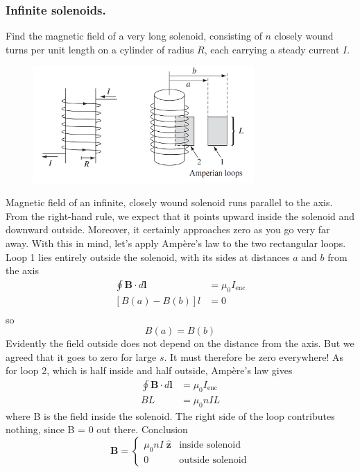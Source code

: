 \documentclass[../../../main.tex]{subfiles}
\begin{document}
\subsubsection*{Inﬁnite solenoids.} Find the magnetic ﬁeld of a very long solenoid, consisting of $n$ closely wound turns per unit length on a cylinder of radius $R$, each carrying a steady current $I$.

\begin{figure}[ht]
    \centering
    \includegraphics[width=0.75\textwidth]{./Rss/Electromagnetism/Magnetostatics/Solenoid.png}
\end{figure}

Magnetic ﬁeld of an inﬁnite, closely wound solenoid runs parallel to the axis. From the right-hand rule, we expect that it points upward inside the solenoid and downward outside. Moreover, it certainly approaches zero as you go very far away. With this in mind, let’s apply Ampère’s law to the two rectangular loops. Loop 1 lies entirely outside the solenoid, with its sides at distances $a$ 
and $b$ from the axis
\begin{align*}
    \oint \mathbf{B}\cdot d\mathbf{l}&=\mu_0I_{\text{enc}}\\
    [B(a)-B(b)]l&=0\\
\end{align*}
so 
\begin{equation*}
    B(a)=B(b)
\end{equation*}
Evidently the ﬁeld outside does not depend on the distance from the axis. But we agreed that it goes to zero for large $s$. It must therefore be zero everywhere! As for loop 2, which is half inside and half outside, Ampère’s law gives
\begin{align*}
    \oint \mathbf{B}\cdot d\mathbf{l}&=\mu_0I_{\text{enc}}\\
    BL&=\mu_0nIL
\end{align*}
where B is the ﬁeld inside the solenoid. The right side of the loop contributes 
nothing, since B = 0 out there. Conclusion
\begin{equation*}
    \mathbf{B}=\begin{cases}
        \mu_0nI\;\mathbf{\hat{z}}&\text{inside solenoid}\\
        0&\text{outside solenoid}
    \end{cases}
\end{equation*}
\end{document}
